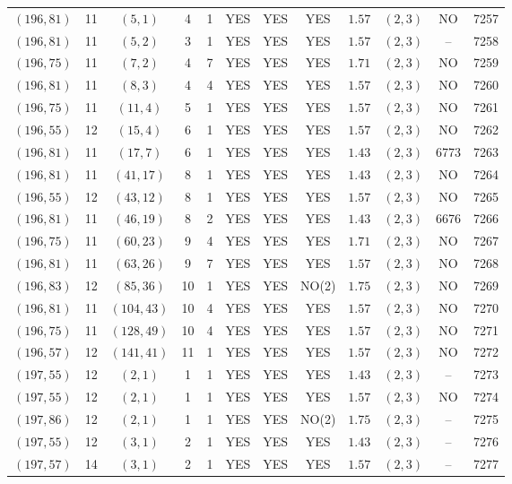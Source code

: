 \begin{longtable}{|c|c|c|c|c|c|c|c|c|c|c|c|}
$(196,81)$ & 11 & $(5,1)$ & 4 & 1 & YES & YES & YES & $1.57$ & $(2,3)$ & NO & 7257\\
$(196,81)$ & 11 & $(5,2)$ & 3 & 1 & YES & YES & YES & $1.57$ & $(2,3)$ & -- & 7258\\
$(196,75)$ & 11 & $(7,2)$ & 4 & 7 & YES & YES & YES & $1.71$ & $(2,3)$ & NO & 7259\\
$(196,81)$ & 11 & $(8,3)$ & 4 & 4 & YES & YES & YES & $1.57$ & $(2,3)$ & NO & 7260\\
$(196,75)$ & 11 & $(11,4)$ & 5 & 1 & YES & YES & YES & $1.57$ & $(2,3)$ & NO & 7261\\
$(196,55)$ & 12 & $(15,4)$ & 6 & 1 & YES & YES & YES & $1.57$ & $(2,3)$ & NO & 7262\\
$(196,81)$ & 11 & $(17,7)$ & 6 & 1 & YES & YES & YES & $1.43$ & $(2,3)$ & 6773 & 7263\\
$(196,81)$ & 11 & $(41,17)$ & 8 & 1 & YES & YES & YES & $1.43$ & $(2,3)$ & NO & 7264\\
$(196,55)$ & 12 & $(43,12)$ & 8 & 1 & YES & YES & YES & $1.57$ & $(2,3)$ & NO & 7265\\
$(196,81)$ & 11 & $(46,19)$ & 8 & 2 & YES & YES & YES & $1.43$ & $(2,3)$ & 6676 & 7266\\
$(196,75)$ & 11 & $(60,23)$ & 9 & 4 & YES & YES & YES & $1.71$ & $(2,3)$ & NO & 7267\\
$(196,81)$ & 11 & $(63,26)$ & 9 & 7 & YES & YES & YES & $1.57$ & $(2,3)$ & NO & 7268\\
$(196,83)$ & 12 & $(85,36)$ & 10 & 1 & YES & YES & NO(2) & $1.75$ & $(2,3)$ & NO & 7269\\
$(196,81)$ & 11 & $(104,43)$ & 10 & 4 & YES & YES & YES & $1.57$ & $(2,3)$ & NO & 7270\\
$(196,75)$ & 11 & $(128,49)$ & 10 & 4 & YES & YES & YES & $1.57$ & $(2,3)$ & NO & 7271\\
$(196,57)$ & 12 & $(141,41)$ & 11 & 1 & YES & YES & YES & $1.57$ & $(2,3)$ & NO & 7272\\
$(197,55)$ & 12 & $(2,1)$ & 1 & 1 & YES & YES & YES & $1.43$ & $(2,3)$ & -- & 7273\\
$(197,55)$ & 12 & $(2,1)$ & 1 & 1 & YES & YES & YES & $1.57$ & $(2,3)$ & NO & 7274\\
$(197,86)$ & 12 & $(2,1)$ & 1 & 1 & YES & YES & NO(2) & $1.75$ & $(2,3)$ & -- & 7275\\
$(197,55)$ & 12 & $(3,1)$ & 2 & 1 & YES & YES & YES & $1.43$ & $(2,3)$ & -- & 7276\\
$(197,57)$ & 14 & $(3,1)$ & 2 & 1 & YES & YES & YES & $1.57$ & $(2,3)$ & -- & 7277\\

\end{longtable}
